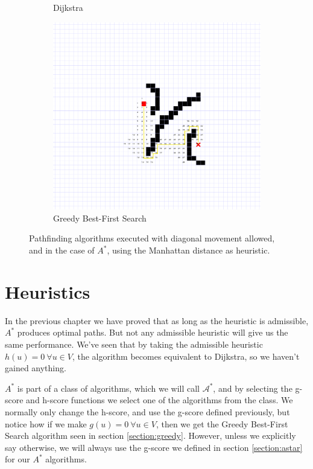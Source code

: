 \documentclass[a4paper,10pt]{report}
\begin{document}
\begin{figure}
\begin{subfigure}[b]{0.45\textwidth}
	\caption{Dijkstra}
\end{subfigure}
\begin{subfigure}[b]{0.45\textwidth}
	\includegraphics[width=1\linewidth]{greedy-nodes}
	\caption{Greedy Best-First Search}
\end{subfigure}
\caption{Pathfinding algorithms executed with diagonal movement allowed, and in the case of $A^*$, using the Manhattan distance as heuristic.}
\label{fig:node-expansion}
\end{figure}


\chapter{Heuristics}
In the previous chapter we have proved that as long as the heuristic is admissible, $A^*$ produces optimal paths. But not any admissible heuristic will give us the same performance. We've seen that by taking the admissible heuristic $h(u) = 0 \  \forall u \in V$, the algorithm becomes equivalent to Dijkstra, so we haven't gained anything.

$A^*$ is part of a class of algorithms, which we will call $\mathcal{A^*}$, and by selecting the g-score and h-score functions we select one of the algorithms from the class. We normally only change the h-score, and use the g-score defined previously, but notice how if we make $g(u) = 0 \  \forall u \in V$, then we get the Greedy Best-First Search algorithm seen in section \ref{section:greedy}. However, unless we explicitly say otherwise, we will always use the g-score we defined in section \ref{section:astar} for our $A^*$ algorithms.
\end{document}
